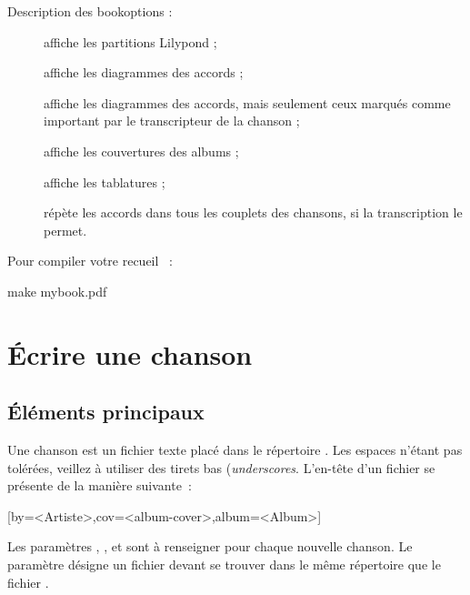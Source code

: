 Description des \og bookoptions \fg{} :
\begin{description}
  \item[] affiche les partitions Lilypond ;
  \item[] affiche les diagrammes des accords ;
  \item[] affiche les diagrammes des
    accords, mais seulement ceux marqués comme important par le
    transcripteur de la chanson ;
  \item[] affiche les couvertures des albums ;
  \item[] affiche les tablatures ;
  \item[] répète les accords dans tous les
    couplets des chansons, si la transcription le permet.
\end{description}

Pour compiler votre recueil ~:
\begin{unix}
make mybook.pdf
\end{unix}


\section{Écrire une chanson}
\label{sec:write-song}

\subsection{Éléments principaux}

Une chanson est un fichier texte  placé dans
le répertoire . Les espaces n'étant pas
tolérées, veillez à utiliser des tirets bas (\emph{underscores}.
L'en-tête d'un fichier
 se présente de la manière suivante~:

\begin{songbook}
  [by=<Artiste>,cov=<album-cover>,album=<Album>]
\end{songbook}

Les paramètres , ,
 et  sont à renseigner pour chaque
nouvelle chanson. Le paramètre  désigne un
fichier  devant se trouver dans le même
répertoire que le fichier .

